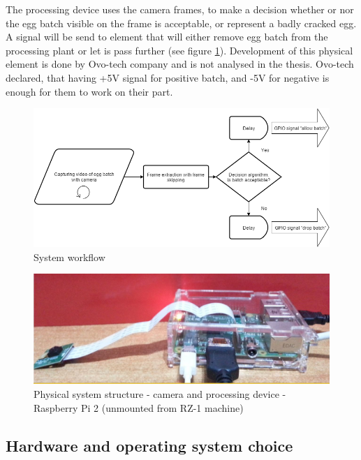 \documentclass[12pt,twoside,a4paper]{article}
\begin{document}
The processing device uses the camera frames, to make a decision whether or nor the egg batch visible on the frame is acceptable, or represent a badly cracked egg.
A signal will be send to element that will either remove egg batch from the processing plant or let is pass further (see figure \ref{fig:system}).
Development of this physical element is done by Ovo-tech company and is not analysed in the thesis. Ovo-tech declared, that having +5V signal for positive batch, and -5V for negative is enough for them to work on their part.


\begin{figure}[H]
\centering
\includegraphics[width=0.8\paperwidth]{system}
\caption{System workflow}\label{fig:system}
\end{figure}

\begin{figure}[H]
\centering
\includegraphics[width=0.8\paperwidth]{phisical}
\caption{Physical system structure - camera and processing device - Raspberry Pi 2 (unmounted from RZ-1 machine)}\label{fig:phisical}
\end{figure}


\subsection{Hardware and operating system choice}
\end{document}
